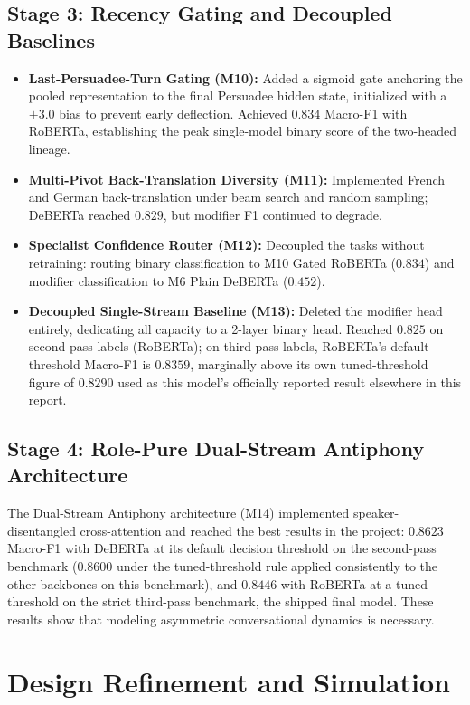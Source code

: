 \subsection{Stage 3: Recency Gating and Decoupled Baselines}
\begin{itemize}
  \item \textbf{Last-Persuadee-Turn Gating (M10):} Added a sigmoid gate anchoring the pooled representation to the final Persuadee hidden state, initialized with a $+3.0$ bias to prevent early deflection. Achieved \textbf{$0.834$} Macro-F1 with RoBERTa, establishing the peak single-model binary score of the two-headed lineage.
  \item \textbf{Multi-Pivot Back-Translation Diversity (M11):} Implemented French and German back-translation under beam search and random sampling; DeBERTa reached \textbf{$0.829$}, but modifier F1 continued to degrade.
  \item \textbf{Specialist Confidence Router (M12):} Decoupled the tasks without retraining: routing binary classification to M10 Gated RoBERTa ($0.834$) and modifier classification to M6 Plain DeBERTa ($0.452$).
  \item \textbf{Decoupled Single-Stream Baseline (M13):} Deleted the modifier head entirely, dedicating all capacity to a 2-layer binary head. Reached \textbf{$0.825$} on second-pass labels (RoBERTa); on third-pass labels, RoBERTa's default-threshold Macro-F1 is \textbf{$0.8359$}, marginally above its own tuned-threshold figure of $0.8290$ used as this model's officially reported result elsewhere in this report.
\end{itemize}

\subsection{Stage 4: Role-Pure Dual-Stream Antiphony Architecture}
The Dual-Stream Antiphony architecture (M14) implemented speaker-disentangled cross-attention and reached the best results in the project: $0.8623$ Macro-F1 with DeBERTa at its default decision threshold on the second-pass benchmark ($0.8600$ under the tuned-threshold rule applied consistently to the other backbones on this benchmark), and $0.8446$ with RoBERTa at a tuned threshold on the strict third-pass benchmark, the shipped final model. These results show that modeling asymmetric conversational dynamics is necessary.

\section{Design Refinement and Simulation}
\label{sec:detailed-design}

